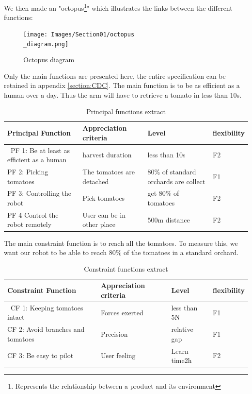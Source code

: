 We then made an "\gls{octopus}\footnote{Represents the relationship between a product and its environment}" which illustrates the links between the different functions: 
\begin{figure}[ht]
    \centering
    \texttt{[image: Images/Section01/octopus\\\_diagram.png]}
    \caption{Octopus diagram}
    \label{fig:octopus}
\end{figure}

\bigbreak
Only the main functions are presented here, the entire specification can be retained in appendix \ref{section:CDC}. The main function is to be as efficient as a human over a day. Thus the arm will have to retrieve a tomato in less than 10s. 

\begin{table}[ht]
    \centering  
    \begin{tabular}{|p{3cm} | p{3cm} | p{3cm} | p{3cm} |} 
        \hline
        \textbf{Principal Function} & \textbf{Appreciation criteria} & \textbf{Level} & \textbf{flexibility} \\ [0.5ex] 
        \hline\
        PF 1: Be at least as efficient as a human & harvest duration & less than 10s & F2 \\ 
        \hline
        PF 2: Picking tomatoes & The tomatoes are detached & 80\% of standard orchards are collect & F1 \\
        \hline
        PF 3: Controlling the robot & Pick tomatoes & get 80\% of tomatoes & F2 \\
        \hline
        PF 4 Control the robot remotely  & User can be in other place & 500m distance & F2 \\
        \hline
    \end{tabular}
    \caption{Principal functions extract}
\end{table}
\FloatBarrier

\bigbreak
The main constraint function is to reach all the tomatoes. To measure this, we want our robot to be able to reach 80\% of the tomatoes in a standard orchard. 

\begin{table}[H]
    \centering    
    \begin{tabular}{|p{3cm} | p{3cm} | p{3cm} | p{3cm} |} 
        \hline
        \textbf{Constraint Function} & \textbf{Appreciation criteria} & \textbf{Level} & \textbf{flexibility} \\ [0.5ex] 
        \hline\
        CF 1: Keeping tomatoes intact & Forces exerted & less than 5N & F1 \\ 
        \hline
        CF 2: Avoid branches and tomatoes & Precision & relative gap\less1cm & F1 \\
        \hline
        CF 3: Be easy to pilot & User feeling & Learn time\less2h & F2 \\
        \hline
    \end{tabular}
    \caption{Constraint functions extract}
\end{table}
